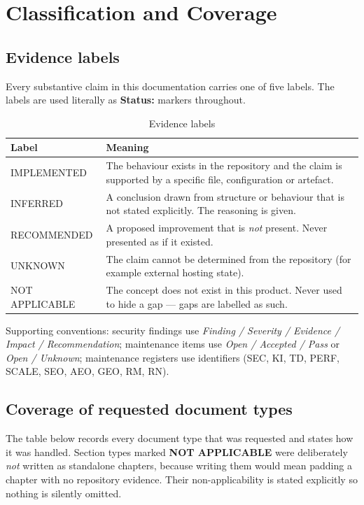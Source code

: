 \chapter{Classification and Coverage}
\label{app:classification}

\section{Evidence labels}

Every substantive claim in this documentation carries one of five labels. The
labels are used literally as \textbf{Status:} markers throughout.

\begin{longtable}{p{3.4cm}p{11cm}}
\caption{Evidence labels}\\
\toprule
\textbf{Label} & \textbf{Meaning} \\
\midrule

IMPLEMENTED & The behaviour exists in the repository and the claim is supported by
a specific file, configuration or artefact. \\
INFERRED & A conclusion drawn from structure or behaviour that is not stated
explicitly. The reasoning is given. \\
RECOMMENDED & A proposed improvement that is \emph{not} present. Never presented
as if it existed. \\
UNKNOWN & The claim cannot be determined from the repository (for example
external hosting state). \\
NOT APPLICABLE & The concept does not exist in this product. Never used to hide a
gap --- gaps are labelled as such. \\
\bottomrule
\end{longtable}

Supporting conventions: security findings use \emph{Finding / Severity / Evidence
/ Impact / Recommendation}; maintenance items use \emph{Open / Accepted / Pass}
or \emph{Open / Unknown}; maintenance registers use identifiers (SEC, KI, TD,
PERF, SCALE, SEO, AEO, GEO, RM, RN).

\section{Coverage of requested document types}

The table below records every document type that was requested and states how it
was handled. Section types marked \textbf{NOT APPLICABLE} were deliberately
\emph{not} written as standalone chapters, because writing them would mean
padding a chapter with no repository evidence. Their non-applicability is stated
explicitly so nothing is silently omitted.

